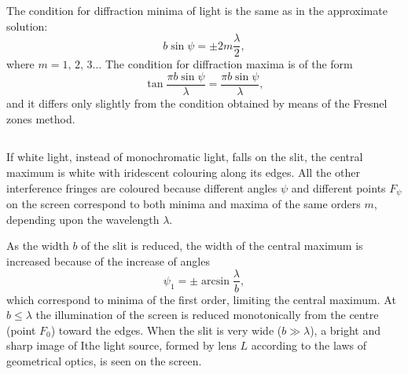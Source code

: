 \begin{enumerate}[label = (\alph*)]
The condition for diffraction minima of light is the same as in
the approximate solution: 
\begin{equation*}%
b \sin \psi = \pm 2 m \frac{\lambda}{2},
\end{equation*}
 where $m = 1,\,2, \, 3 \dots{}$
The condition for diffraction maxima is of the form
\begin{equation*}%
\tan \frac{\pi b \sin \psi}{\lambda} = \frac{\pi b \sin \psi}{\lambda},
\end{equation*} 
and it differs only slightly from the condition obtained by means of the Fresnel zones method.
\end{enumerate}

\subsection{}\label{33.3.2} If white light, instead of monochromatic light, falls on the slit, the central maximum is white with iridescent colouring along its edges. All the other interference fringes are coloured because different angles $\psi$ and different points $F_{\psi}$ on the screen correspond to both minima and maxima of the same orders $m$,  depending upon the wavelength $\lambda$.

As the width $b$ of the slit is reduced, the width of the central maximum is increased because of the increase of angles   
\begin{equation*}%
\psi_{1} = \pm \arcsin \frac{\lambda}{b},
\end{equation*} 
which correspond to minima of the first order, limiting the central maximum. At $b \leqslant \lambda$ the illumination of the screen is reduced monotonically from the centre (point $F_{0}$) toward the edges. When the slit is very wide ($b \gg \lambda$), a bright and sharp image of Ithe light source, formed by lens $L$ according to the laws of geometrical optics, is seen on the screen.


